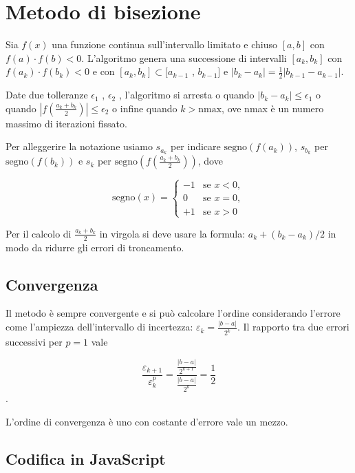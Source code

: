 \section{Metodo di bisezione}

Sia $f (x)$ una funzione continua sull'intervallo limitato e chiuso $[a, b]$ con $f (a) \cdot f (b) < 0$. L'algoritmo genera una successione di intervalli
$[a_k , b_k]$ con $f (a_k ) \cdot f (b_k ) < 0$ e con $[a_k , b_k ] \subset [a_{k-1}$ , $b_{k-1} ]$ e $|b_k - a_k | = \frac{1}{2}|b_{k-1} - a_{k-1} |$. 

Date due tolleranze $\epsilon_1$ , $\epsilon_2$ , l’algoritmo si arresta o quando $|b_k - a_k | \leq \epsilon_1$ o quando $|f (\frac {a_k +b_k}{2} )| \leq
\epsilon_2$ o infine quando $k > \text{nmax}$, ove nmax è un numero massimo di iterazioni fissato.

Per alleggerire la notazione usiamo $s_{a_k}$ per indicare $\mathrm{segno} \left(f\left(a_k\right)\right)$,
$s_{b_k}$ per $\mathrm{segno}(f(b_k))$ e
$s_k$ per $\mathrm{segno}(f (\frac {a_k +b_k}{2}))$, dove

\begin{equation}
    \mathrm{segno}(x) =
    \begin{cases}
        -1 & \text{se } x < 0, \\
         0 & \text{{se }} x = 0, \\
        +1 & \text{{se }} x > 0
    \end{cases}
\end{equation}

Per il calcolo di $\frac{a_k+b_k}{2}$ in virgola si deve usare la formula: $a_k + (b_k - a_k) / 2$ in modo da ridurre gli errori di troncamento.

\subsection{Convergenza}

Il metodo è sempre convergente e si può calcolare l'ordine considerando l'errore
come l'ampiezza dell'intervallo di incertezza: $\varepsilon_k = \frac{|b - a|}{2^k}$.
Il rapporto tra due errori successivi per $p=1$ vale

$$\displaystyle \frac{\varepsilon_{k+1}}{\varepsilon_{k}^p}
=\frac{
    \frac{|b - a|}{2^{k+1}}
  }{
      \frac{|b - a|}{2^k}
  }
  = \frac{1}{2}$$.

L'ordine di convergenza è uno con costante d'errore vale un mezzo.

\subsection{Codifica in JavaScript}

